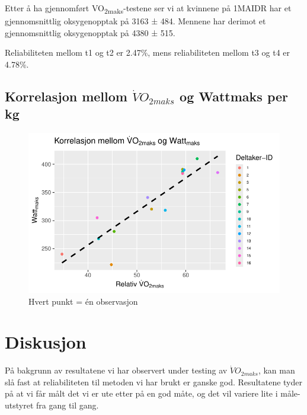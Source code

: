 \documentclass[
  letterpaper,
  DIV=11,
  numbers=noendperiod]{scrreprt}
\begin{document}
Etter å ha gjennomført VO\textsubscript{2maks}-testene ser vi at
kvinnene på 1MAIDR har et gjennomsnittlig oksygenopptak på 3163 ± 484.
Mennene har derimot et gjennomsnittlig oksygenopptak på 4380 ± 515.

Reliabiliteten mellom t1 og t2 er 2.47\%, mens reliabiliteten mellom t3
og t4 er 4.78\%.

\subsection{\texorpdfstring{Korrelasjon mellom
\textbf{\(\dot{V}O_{2maks}\)} og Wattmaks per
kg}{Korrelasjon mellom \textbackslash dot\{V\}O\_\{2maks\} og Wattmaks per kg}}\label{korrelasjon-mellom-dotvo_2maks-og-wattmaks-per-kg}

\begin{figure}[H]

{\centering \includegraphics{01-reliability-tools_files/figure-pdf/unnamed-chunk-10-1.pdf}

}

\caption{Hvert punkt = én observasjon}

\end{figure}%

\section{Diskusjon}\label{diskusjon}

På bakgrunn av resultatene vi har observert under testing av
\(\dot{V}O_{2maks}\), kan man slå fast at reliabiliteten til metoden vi
har brukt er ganske god. Resultatene tyder på at vi får målt det vi er
ute etter på en god måte, og det vil variere lite i måle-utstyret fra
gang til gang.
\end{document}
